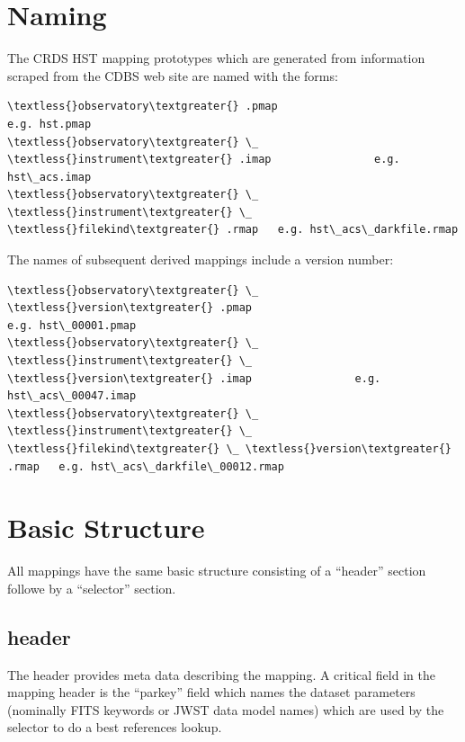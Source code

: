 \documentclass[letterpaper,10pt,english]{sphinxmanual}
\begin{document}
\section{Naming}
\label{rmap_syntax:naming}
The CRDS HST mapping prototypes which are generated from information scraped from
the CDBS web site are named with the forms:

\begin{Verbatim}[commandchars=\\\{\}]
\textless{}observatory\textgreater{} .pmap                               e.g. hst.pmap
\textless{}observatory\textgreater{} \_ \textless{}instrument\textgreater{} .imap                e.g. hst\_acs.imap
\textless{}observatory\textgreater{} \_ \textless{}instrument\textgreater{} \_ \textless{}filekind\textgreater{} .rmap   e.g. hst\_acs\_darkfile.rmap
\end{Verbatim}

The names of subsequent derived mappings include a version number:

\begin{Verbatim}[commandchars=\\\{\}]
\textless{}observatory\textgreater{} \_ \textless{}version\textgreater{} .pmap                               e.g. hst\_00001.pmap
\textless{}observatory\textgreater{} \_ \textless{}instrument\textgreater{} \_ \textless{}version\textgreater{} .imap                e.g. hst\_acs\_00047.imap
\textless{}observatory\textgreater{} \_ \textless{}instrument\textgreater{} \_ \textless{}filekind\textgreater{} \_ \textless{}version\textgreater{} .rmap   e.g. hst\_acs\_darkfile\_00012.rmap
\end{Verbatim}


\section{Basic Structure}
\label{rmap_syntax:basic-structure}
All mappings have the same basic structure consisting of a ``header'' section followe by a ``selector'' section.


\subsection{header}
\label{rmap_syntax:header}
The header provides meta data describing the mapping.  A critical field in the mapping header is the ``parkey''
field which names the dataset parameters (nominally FITS keywords or JWST data model names) which are used by
the selector to do a best references lookup.
\end{document}
